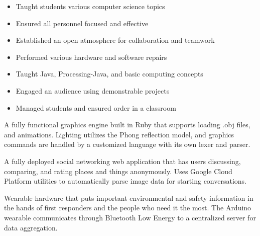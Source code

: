 \documentclass[10pt,a4paper,ragged2e,withhyper]{altacv}
\begin{document}
\begin{paracol}{2}
\divider{}

\begin{itemize}
\item Taught students various computer science topics
\item Ensured all personnel focused and effective
\item Established an open atmosphere for collaboration and teamwork
\item Performed various hardware and software repairs
\end{itemize}


\begin{itemize}
\item Taught Java, Processing-Java, and basic computing concepts
\item Engaged an audience using demonstrable projects
\item Managed students and ensured order in a classroom
\end{itemize}


\small

\small{}A fully functional graphics engine built in Ruby that supports loading .obj files, and animations.
Lighting utilizes the Phong reflection model, and graphics commands are handled by a customized language with its own lexer and parser.

\divider{}

\small{}A fully deployed social networking web application that has users discussing, comparing, and rating places and things anonymously.
Uses Google Cloud Platform utilities to automatically parse image data for starting conversations.

\divider{}

\small{}Wearable hardware that puts important environmental and safety information in the hands of first responders and the people who need it the most.
The Arduino wearable communicates through Bluetooth Low Energy to a centralized server for data aggregation.


\end{paracol}
\end{document}

